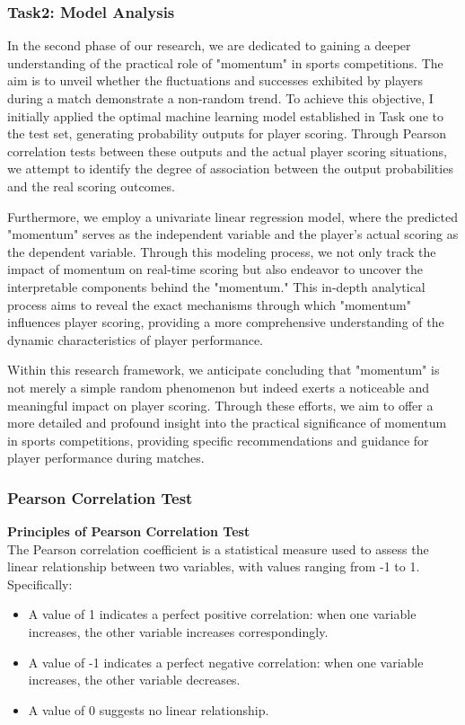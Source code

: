 \documentclass[12pt]{article}
\begin{document}
\subsubsection{Task2: Model Analysis}
In the second phase of our research, we are dedicated to gaining a deeper understanding of the practical role of "momentum" in sports competitions. The aim is to unveil whether the fluctuations and successes exhibited by players during a match demonstrate a non-random trend.
To achieve this objective, I initially applied the optimal machine learning model established in Task one to the test set, generating probability outputs for player scoring. Through Pearson correlation tests between these outputs and the actual player scoring situations,
we attempt to identify the degree of association between the output probabilities and the real scoring outcomes.

Furthermore, we employ a univariate linear regression model, where the predicted "momentum" serves as the independent variable and the player's actual scoring as the dependent variable. Through this modeling process, we not only track the impact of momentum on real-time scoring
but also endeavor to uncover the interpretable components behind the "momentum." This in-depth analytical process aims to reveal the exact mechanisms through which "momentum" influences player scoring, providing a more comprehensive understanding of the dynamic characteristics of player performance.

Within this research framework, we anticipate concluding that "momentum" is not merely a simple random phenomenon but indeed exerts a noticeable and meaningful impact on player scoring. Through these efforts, we aim to offer a more detailed and profound insight into the practical significance
of momentum in sports competitions, providing specific recommendations and guidance for player performance during matches.
\subsubsection{Pearson Correlation Test}
\textbf{Principles of Pearson Correlation Test}\\

The Pearson correlation coefficient is a statistical measure used to assess the linear relationship between two variables, with values ranging from -1 to 1. Specifically:

\begin{itemize}
  \item A value of 1 indicates a perfect positive correlation: when one variable increases, the other variable increases correspondingly.
  \item A value of -1 indicates a perfect negative correlation: when one variable increases, the other variable decreases.
  \item A value of 0 suggests no linear relationship.
\end{itemize}
\end{document}
